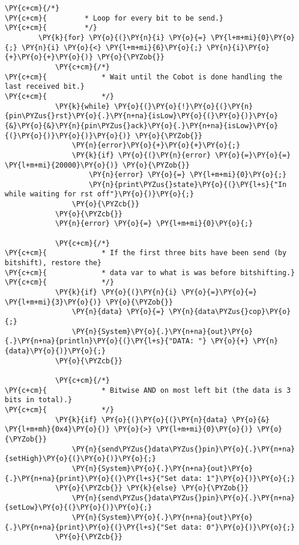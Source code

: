 \begin{Verbatim}[commandchars=\\\{\}]
        \PY{c+cm}{/*}
\PY{c+cm}{         * Loop for every bit to be send.}
\PY{c+cm}{         */}
        \PY{k}{for} \PY{o}{(}\PY{n}{i} \PY{o}{=} \PY{l+m+mi}{0}\PY{o}{;} \PY{n}{i} \PY{o}{<} \PY{l+m+mi}{6}\PY{o}{;} \PY{n}{i}\PY{o}{+}\PY{o}{+}\PY{o}{)} \PY{o}{\PYZob{}}
            \PY{c+cm}{/*}
\PY{c+cm}{             * Wait until the Cobot is done handling the last received bit.}
\PY{c+cm}{             */}
            \PY{k}{while} \PY{o}{(}\PY{o}{!}\PY{o}{(}\PY{n}{pin\PYZus{}rst}\PY{o}{.}\PY{n+na}{isLow}\PY{o}{(}\PY{o}{)}\PY{o}{&}\PY{o}{&}\PY{n}{pin\PYZus{}ack}\PY{o}{.}\PY{n+na}{isLow}\PY{o}{(}\PY{o}{)}\PY{o}{)}\PY{o}{)} \PY{o}{\PYZob{}}
                \PY{n}{error}\PY{o}{+}\PY{o}{+}\PY{o}{;}
                \PY{k}{if} \PY{o}{(}\PY{n}{error} \PY{o}{=}\PY{o}{=} \PY{l+m+mi}{20000}\PY{o}{)} \PY{o}{\PYZob{}}
                    \PY{n}{error} \PY{o}{=} \PY{l+m+mi}{0}\PY{o}{;}
                    \PY{n}{print\PYZus{}state}\PY{o}{(}\PY{l+s}{"In while waiting for rst off"}\PY{o}{)}\PY{o}{;}
                \PY{o}{\PYZcb{}}
            \PY{o}{\PYZcb{}}
            \PY{n}{error} \PY{o}{=} \PY{l+m+mi}{0}\PY{o}{;}

            \PY{c+cm}{/*}
\PY{c+cm}{             * If the first three bits have been send (by bitshift), restore the}
\PY{c+cm}{             * data var to what is was before bitshifting.}
\PY{c+cm}{             */}
            \PY{k}{if} \PY{o}{(}\PY{n}{i} \PY{o}{=}\PY{o}{=} \PY{l+m+mi}{3}\PY{o}{)} \PY{o}{\PYZob{}}
                \PY{n}{data} \PY{o}{=} \PY{n}{data\PYZus{}cop}\PY{o}{;}
                \PY{n}{System}\PY{o}{.}\PY{n+na}{out}\PY{o}{.}\PY{n+na}{println}\PY{o}{(}\PY{l+s}{"DATA: "} \PY{o}{+} \PY{n}{data}\PY{o}{)}\PY{o}{;}
            \PY{o}{\PYZcb{}}

            \PY{c+cm}{/*}
\PY{c+cm}{             * Bitwise AND on most left bit (the data is 3 bits in total).}
\PY{c+cm}{             */}
            \PY{k}{if} \PY{o}{(}\PY{o}{(}\PY{n}{data} \PY{o}{&} \PY{l+m+mh}{0x4}\PY{o}{)} \PY{o}{>} \PY{l+m+mi}{0}\PY{o}{)} \PY{o}{\PYZob{}}
                \PY{n}{send\PYZus{}data\PYZus{}pin}\PY{o}{.}\PY{n+na}{setHigh}\PY{o}{(}\PY{o}{)}\PY{o}{;}
                \PY{n}{System}\PY{o}{.}\PY{n+na}{out}\PY{o}{.}\PY{n+na}{print}\PY{o}{(}\PY{l+s}{"Set data: 1"}\PY{o}{)}\PY{o}{;}
            \PY{o}{\PYZcb{}} \PY{k}{else} \PY{o}{\PYZob{}}
                \PY{n}{send\PYZus{}data\PYZus{}pin}\PY{o}{.}\PY{n+na}{setLow}\PY{o}{(}\PY{o}{)}\PY{o}{;}
                \PY{n}{System}\PY{o}{.}\PY{n+na}{out}\PY{o}{.}\PY{n+na}{print}\PY{o}{(}\PY{l+s}{"Set data: 0"}\PY{o}{)}\PY{o}{;}
            \PY{o}{\PYZcb{}}


\end{Verbatim}
